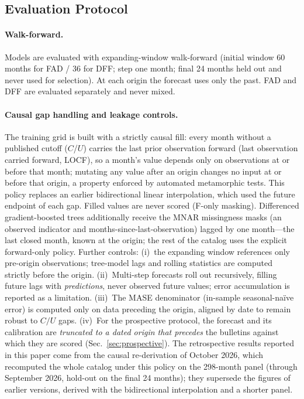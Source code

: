 \documentclass[runningheads]{llncs}
\begin{document}
\subsection{Evaluation Protocol}
\label{sec:eval}

\paragraph{Walk-forward.} Models are evaluated with expanding-window walk-forward
(initial window 60 months for FAD / 36 for DFF; step one month; final 24 months
held out and never used for selection). At each origin the forecast uses only the
past. FAD and DFF are evaluated separately and never mixed.

\paragraph{Causal gap handling and leakage controls.} The training grid is built
with a strictly causal fill: every month without a published cutoff ($C$/$U$)
carries the last prior observation forward (last observation carried forward,
LOCF), so a month's value depends only on observations at or before that month;
mutating any value after an origin changes no input at or before that origin, a
property enforced by automated metamorphic tests. This policy replaces an earlier
bidirectional linear interpolation, which used the future endpoint of each gap.
Filled values are never scored (F-only masking). Differenced gradient-boosted trees
additionally receive the MNAR missingness masks (an observed indicator and
months-since-last-observation) lagged by one month---the last closed month, known
at the origin; the rest of the catalog uses the explicit forward-only policy.
Further controls: (i)~the expanding window references only pre-origin
observations; tree-model lags and rolling statistics are computed strictly before
the origin. (ii)~Multi-step forecasts roll out recursively, filling future lags with
\emph{predictions}, never observed future values; error accumulation is reported as
a limitation. (iii)~The MASE denominator (in-sample seasonal-naïve error) is
computed only on data preceding the origin, aligned by date to remain robust to
$C/U$ gaps. (iv)~For the prospective protocol, the forecast and its calibration are
\emph{truncated to a dated origin that precedes} the bulletins against which they are
scored (Sec.~\ref{sec:prospective}). The retrospective results reported in this paper
come from the causal re-derivation of October 2026, which recomputed the whole catalog
under this policy on the 298-month panel (through September 2026, hold-out on the final
24 months); they supersede the figures of earlier versions, derived with the
bidirectional interpolation and a shorter panel.
\end{document}
